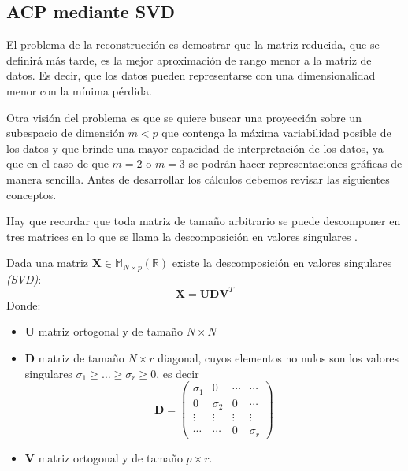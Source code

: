 \subsection{ACP mediante SVD}
\noindent El problema de la reconstrucción es demostrar que la matriz reducida, que se definirá más tarde, es la mejor aproximación de rango menor a la matriz de datos. Es decir, que los datos pueden representarse con una dimensionalidad menor con la mínima pérdida.

\noindent Otra visión del problema es que se quiere buscar una proyección sobre un subespacio de dimensión $m<p$ que contenga la máxima variabilidad posible de los datos y que brinde una mayor capacidad de interpretación de los datos, ya que en el caso de que $m=2$ o $m=3$ se podrán hacer representaciones gráficas de manera sencilla. 
Antes de desarrollar los cálculos debemos revisar las siguientes conceptos.

\noindent Hay que recordar que toda matriz de tamaño arbitrario se puede descomponer en tres matrices en lo que se llama la descomposición en valores singulares \cite{Abdi 2010}.

\begin{defi}
Dada una matriz $\textbf{X}\in  \mathbb{M}_{N\times p}(\mathbb{R})$ existe la descomposición en valores singulares \textit{(SVD)}:
\begin{equation}
\textbf{X}=\textbf{U}\mathbf{D}\textbf{V}^T
\end{equation}
Donde:
\begin{itemize}
\item \textbf{U} matriz ortogonal y de tamaño $N \times N$
\item $\mathbf{D}$ matriz de tamaño $N \times r$ diagonal, cuyos elementos no nulos son los valores singulares $\sigma_1\geq\ldots\geq \sigma_r\geq 0$, es decir
\begin{equation}
\mathbf{D}=\begin{pmatrix}
\sigma_1 & 0 & \cdots  & \cdots \\
0 & \sigma_2 & 0 & \cdots\\
\vdots & \vdots & \vdots & \vdots\\
\cdots & \cdots & 0 & \sigma_r
\end{pmatrix}
\end{equation}
\item \textbf{V} matriz ortogonal y de tamaño $p \times r$. 
\end{itemize}
\end{defi}

